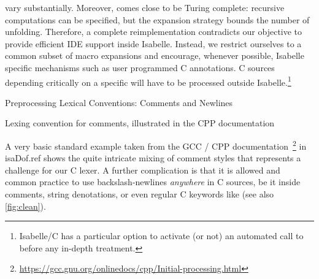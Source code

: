 \begin{isabellebody}
\begin{isamarkuptext}
vary substantially.  Moreover,  comes close to be Turing complete:
recursive computations can be specified, but the expansion strategy bounds the number of
unfolding. Therefore, a complete  reimplementation contradicts our
objective to provide efficient IDE support inside Isabelle. Instead, we restrict ourselves to a
common subset of macro expansions and encourage, whenever possible, Isabelle specific mechanisms
such as user programmed C annotations. C sources depending critically on a specific
 will have to be processed outside
Isabelle.\footnote{Isabelle/C has a particular option to activate (or not) an automated
call to  before any in-depth treatment.}%
\end{isamarkuptext}\isamarkuptrue%
%
\begin{isamarkupsubsection*}%
[label = {lexer_ex},type = {scholarly_paper.technical}, args={label = {lexer_ex},type = {scholarly_paper.technical}, Isa_COL.text_element.level = {}, Isa_COL.text_element.referentiable = {False}, Isa_COL.text_element.variants = {{STR ''outline'', STR ''document''}}, scholarly_paper.text_section.main_author = {}, scholarly_paper.text_section.fixme_list = {}, Isa_COL.text_element.level = {}, scholarly_paper.technical.definition_list = {}}]Preprocessing Lexical Conventions: Comments and Newlines%
\end{isamarkupsubsection*}\isamarkuptrue%
%
\begin{isamarkupfigure*}%
[label = {C-sample2},type = {Isa_COL.figure}, args={label = {C-sample2},type = {Isa_COL.figure}, Isa_COL.figure.relative_width = {42}, Isa_COL.figure.src = {figures/A-C-Source2}, Isa_COL.figure.spawn_columns = {True}}]Lexing convention for comments, illustrated in the CPP documentation%
\end{isamarkupfigure*}\isamarkuptrue%
%
\begin{isamarkuptext}%
A very basic standard example taken from the GCC / CPP documentation~\footnote{\url{https://gcc.gnu.org/onlinedocs/cpp/Initial-processing.html}}
in \csname isaDof.ref shows the quite intricate mixing of comment styles that
represents a challenge for our C lexer. A further complication is that it is allowed and common
practice to use backslash-newlines \isa{{\isacharbackslash}{\isasymnewline}} \emph{anywhere} in C
sources, be it inside comments, string denotations, or even regular C keywords like
 (see also \autoref{fig:clean}).


\end{isamarkuptext}
\end{isabellebody}
